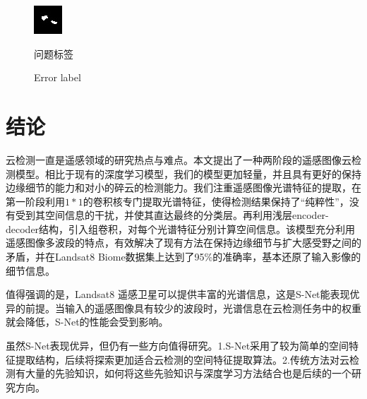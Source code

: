 \documentclass[10pt,UTF8,fntef]{ctexart}
\begin{document}
\begin{multicols}{2}
\begin{figure}[H]
{\begin{minipage}[b]{0.15\linewidth}
            \includegraphics[width=1\linewidth]{../log/spoon4/cut/tmp_cut_LC81390292014135LGN00_14081_unet.jpg}\vspace{4pt}
        \end{minipage}
    }
\caption{问题标签}
\addtocounter{figure}{-1}
\vspace{-5pt}
\renewcommand{\figurename}{Fig}
\caption{Error label}
\renewcommand{\figurename}{图}
\label{Fig.main2}
\end{figure}

\section[]{结论}
云检测一直是遥感领域的研究热点与难点。本文提出了一种两阶段的遥感图像云检测模型。相比于现有的深度学习模型，我们的模型更加轻量，并且具有更好的保持边缘细节的能力和对小的碎云的检测能力。我们注重遥感图像光谱特征的提取，在第一阶段利用$1*1$的卷积核专门提取光谱特征，使得检测结果保持了“纯粹性”，没有受到其空间信息的干扰，并使其直达最终的分类层。再利用浅层encoder-decoder结构，引入组卷积，对每个光谱特征分别计算空间信息。该模型充分利用遥感图像多波段的特点，有效解决了现有方法在保持边缘细节与扩大感受野之间的矛盾，并在Landsat8 Biome数据集上达到了95\%的准确率，基本还原了输入影像的细节信息。

值得强调的是，Landsat8 遥感卫星可以提供丰富的光谱信息，这是S-Net能表现优异的前提。当输入的遥感图像具有较少的波段时，光谱信息在云检测任务中的权重就会降低，S-Net的性能会受到影响。

虽然S-Net表现优异，但仍有一些方向值得研究。1.S-Net采用了较为简单的空间特征提取结构，后续将探索更加适合云检测的空间特征提取算法。2.传统方法对云检测有大量的先验知识，如何将这些先验知识与深度学习方法结合也是后续的一个研究方向。


\end{multicols}
\end{document}
